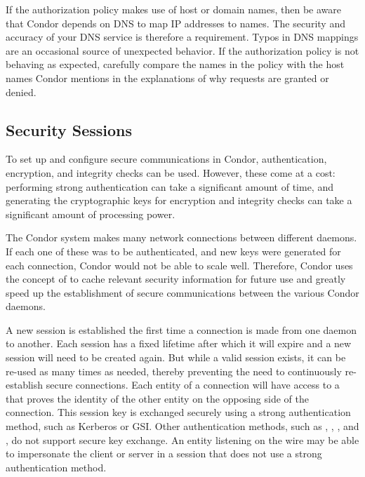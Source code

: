 If the authorization policy makes use of host or domain names, then
be aware that Condor depends on DNS to map IP addresses to names.  The
security and accuracy of your DNS service is therefore a requirement.
Typos in DNS mappings are an occasional source of unexpected behavior.
If the authorization policy is not behaving as expected, carefully compare
the names in the policy with the host names Condor mentions in the
explanations of why requests are granted or denied.

\subsection{\label{sec:Security-Sessions}Security Sessions}

To set up and configure secure communications in Condor,
authentication, encryption, and integrity checks can be used.  
However, these come at a cost: performing strong authentication can
take a significant amount of time, and  generating the cryptographic
keys for encryption and integrity checks can take a significant amount
of processing power. 

The Condor system makes many network connections between different
daemons.  
If each one of these was to be authenticated,
and new keys were generated for each connection,
Condor would not be able to scale well.  
Therefore, Condor uses the concept of  to cache
relevant security information for future use and greatly speed up the
establishment of secure communications between the various Condor
daemons.

A new session is established the first time a connection is made from one daemon to another.
Each session has a fixed lifetime after which it will expire and
a new session will need to be created again.
But while a valid session exists, it can be re-used as many times as
needed, thereby preventing the need to continuously re-establish secure connections.
Each entity of a connection will have access to a  that proves the
identity of the other entity on the opposing side of the connection.
This session key is exchanged securely using
a strong authentication method, such as Kerberos or GSI.
Other authentication methods, such as ,
,  , and
, do not support secure key exchange.
An entity
listening on the wire may be able to impersonate the client or server
in a session that does not use a strong authentication method.

